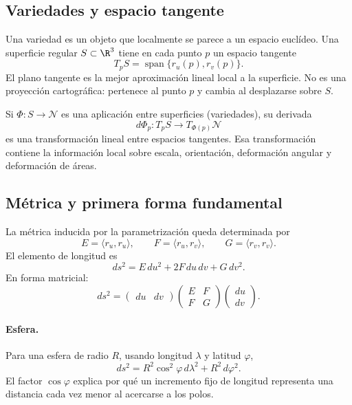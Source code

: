 \subsection{Variedades y espacio tangente}\label{sec:variedades}

Una variedad es un objeto que localmente se parece a un espacio euclídeo. Una superficie
regular \(S\subset\R^3\) tiene en cada punto \(p\) un espacio tangente
\[
  T_pS=\operatorname{span}\{r_u(p),r_v(p)\}.
\]
El plano tangente es la mejor aproximación lineal local a la superficie. No es una proyección
cartográfica: pertenece al punto \(p\) y cambia al desplazarse sobre \(S\).

Si \(\Phi:S\to\mathcal N\) es una aplicación entre superficies (variedades), su derivada
\[
  d\Phi_p:T_pS\longrightarrow T_{\Phi(p)}\mathcal N
\]
es una transformación lineal entre espacios tangentes. Esa transformación contiene la
información local sobre escala, orientación, deformación angular y deformación de áreas.

\subsection{Métrica y primera forma fundamental}\label{sec:metrica}

{\small\vspace{1mm}\par}


La métrica inducida por la parametrización queda determinada por
\[
  E=\langle r_u,r_u\rangle,\qquad
  F=\langle r_u,r_v\rangle,\qquad
  G=\langle r_v,r_v\rangle.
\]
El elemento de longitud es
\[
  \boxed{ds^2=E\,du^2+2F\,du\,dv+G\,dv^2}.
\]
En forma matricial:
\[
  ds^2=
  \begin{pmatrix}du&dv\end{pmatrix}
  \begin{pmatrix}E&F\\F&G\end{pmatrix}
  \begin{pmatrix}du\\dv\end{pmatrix}.
\]

\paragraph{Esfera.}
Para una esfera de radio \(R\), usando longitud \(\lambda\) y latitud \(\varphi\),
\[
  ds^2=R^2\cos^2\varphi\,d\lambda^2+R^2\,d\varphi^2.
\]
El factor \(\cos\varphi\) explica por qué un incremento fijo de longitud representa una
distancia cada vez menor al acercarse a los polos.


